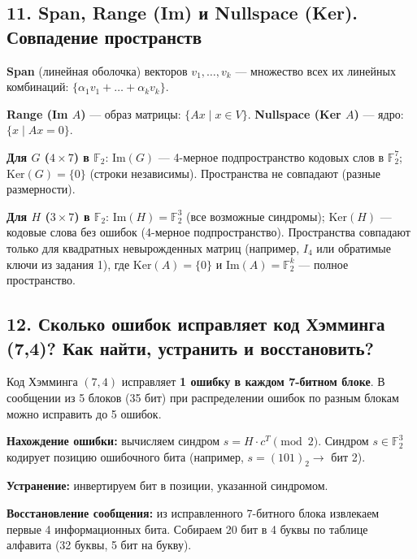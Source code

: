 \documentclass[a4paper, 12pt]{article}
\begin{document}
\subsection*{11. Span, Range (Im) и Nullspace (Ker). Совпадение пространств}

\textbf{Span} (линейная оболочка) векторов $v_1,\dots,v_k$ — множество всех их линейных комбинаций: $\{\alpha_1 v_1 + \dots + \alpha_k v_k\}$.

\textbf{Range (Im $A$)} — образ матрицы: $\{A x \mid x \in V\}$. \textbf{Nullspace (Ker $A$)} — ядро: $\{x \mid A x = 0\}$.

\textbf{Для $G$ ($4\times7$) в $\mathbb{F}_2$}: $\text{Im}(G)$ — 4-мерное подпространство кодовых слов в $\mathbb{F}_2^7$; $\text{Ker}(G) = \{0\}$ (строки независимы). Пространства не совпадают (разные размерности).

\textbf{Для $H$ ($3\times7$) в $\mathbb{F}_2$}: $\text{Im}(H) = \mathbb{F}_2^3$ (все возможные синдромы); $\text{Ker}(H)$ — кодовые слова без ошибок (4-мерное подпространство). Пространства совпадают только для квадратных невырожденных матриц (например, $I_4$ или обратимые ключи из задания 1), где $\text{Ker}(A) = \{0\}$ и $\text{Im}(A) = \mathbb{F}_2^k$ — полное пространство.

\subsection*{12. Сколько ошибок исправляет код Хэмминга (7,4)? Как найти, устранить и восстановить?}

Код Хэмминга $(7,4)$ исправляет \textbf{1 ошибку в каждом 7-битном блоке}. В сообщении из 5 блоков (35 бит) при распределении ошибок по разным блокам можно исправить до 5 ошибок.

\textbf{Нахождение ошибки:} вычисляем синдром $s = H \cdot c^T \pmod{2}$. Синдром $s \in \mathbb{F}_2^3$ кодирует позицию ошибочного бита (например, $s = (101)_2 \to$ бит 2).

\textbf{Устранение:} инвертируем бит в позиции, указанной синдромом.

\textbf{Восстановление сообщения:} из исправленного 7-битного блока извлекаем первые 4 информационных бита. Собираем 20 бит в 4 буквы по таблице алфавита (32 буквы, 5 бит на букву).
\end{document}
